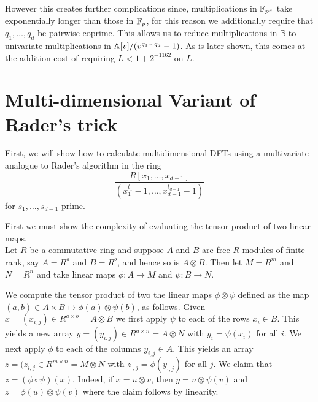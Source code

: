 However this creates further complications since, multiplications in ${\mathbb F}_{p^k}$ take exponentially longer than those in ${\mathbb F}_p$, for this reason we additionally require that $q_1, \ldots, q_d$ be pairwise coprime. This allows us to reduce multiplications in $\mathbb{B}$ to univariate multiplications in ${\mathbb A}[v]/(v^{q_1\cdots q_d} - 1)$. As is later shown, this comes at the addition cost of requiring $L < 1 + 2^{-1162}$ on $L$.

\section{Multi-dimensional Variant of Rader's trick}%
\label{sec:multi_dimensional_variant_of_rader_s_trick}

First, we will show how to calculate multidimensional DFTs using a multivariate analogue to Rader's algorithm in the ring
\[
    \frac{R[x_1, \ldots, x_{d-1}]}{(x_1^{t_1} - 1, \ldots, x_{d-1}^{t_{d-1}} - 1)}
\]
for $s_1, \ldots, s_{d-1}$ prime.



First we must show the complexity of evaluating the tensor product of two linear maps.\\
Let $R$ be a commutative ring and suppose $A$ and $B$ are free $R$-modules of finite rank, say $A = R^a$ and $B = R^b$, and hence so is $A \otimes B$. Then let $M = R^m$ and $N = R^n$ and take linear maps $\phi: A \to M$ and $\psi : B \to N$.

We compute the tensor product of two the linear maps $\phi \otimes \psi$ defined as the map $(a, b) \in A\times B \mapsto \phi(a) \otimes \psi(b)$, as follows. Given $x = (x_{i,j}) \in R^{a \times b} = A \otimes B$ we first apply $\psi$ to each of the rows $x_i \in B$. This yields a new array $y = (y_{i, j}) \in R^{a \times n} = A \otimes N$ with $y_i = \psi(x_i)$ for all $i$. We next apply $\phi$ to each of the columns $y_{i, j} \in A$. This yields an array $z = (z_{i, j} \in R^{m \times n} = M \otimes N$ with $z_{\cdot , j} = \phi(y_{\cdot, j})$ for all $j$. We claim that $z = (\phi \circ \psi)(x)$. Indeed, if $x = u \otimes v$, then $y = u \otimes \psi(v)$ and $z = \phi(u) \otimes \psi(v)$ where the claim follows by linearity.


